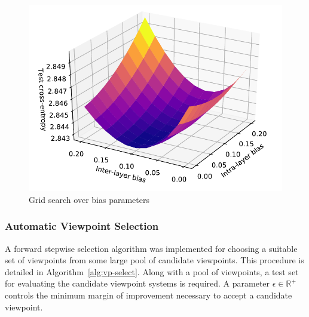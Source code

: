 \documentclass[12pt,a4paper,twoside,openright]{report}
\begin{document}
\begin{figure}[H]
\centering
\includegraphics[width=350pt]{figs/bias_plot.pdf}
\caption{Grid search over bias parameters}
\label{fig:grid-search}
\end{figure}

\vspace{4mm}

\subsubsection{Automatic Viewpoint Selection}

A forward stepwise selection algorithm was implemented for choosing a suitable
set of viewpoints from some large pool of candidate viewpoints. This procedure
is detailed in Algorithm~\ref{alg:vp-select}. Along with a pool of viewpoints, a
test set for evaluating the candidate viewpoint systems is required. A parameter
$\epsilon \in \mathbb{R}^+$ controls the minimum margin of improvement necessary
to accept a candidate viewpoint.
\end{document}
